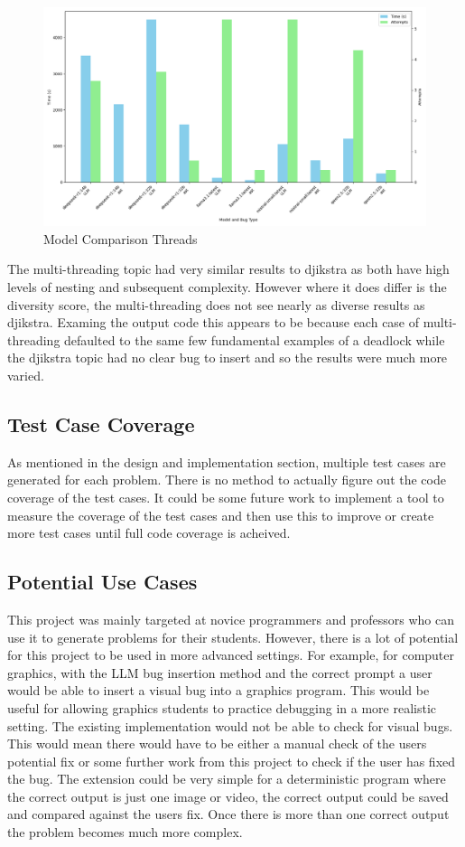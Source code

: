 \documentclass[12pt]{extarticle}
\begin{document}
\begin{figure}[H]
\centering
\includegraphics[width=0.7\linewidth]{Images/Model_Comparison_Threads.png}
\caption{Model Comparison Threads}
\label{fig:Model_Comparison_Threads}
\end{figure}



The multi-threading topic had very similar results to djikstra as both have high levels of nesting and subsequent complexity. However where it does differ is the diversity score, the multi-threading does not see nearly as diverse results as djikstra. Examing the output code this appears to be because each case of multi-threading defaulted to the same few fundamental examples of a deadlock while the djikstra topic had no clear bug to insert and so the results were much more varied.

\subsection{Test Case Coverage}

As mentioned in the design and implementation section, multiple test cases are generated for each problem. There is no method to actually figure out the code coverage of the test cases. It could be some future work to implement a tool to measure the coverage of the test cases and then use this to improve or create more test cases until full code coverage is acheived. 

\subsection{Potential Use Cases}

This project was mainly targeted at novice programmers and professors who can use it to generate problems for their students. However, there is a lot of potential for this project to be used in more advanced settings. For example, for computer graphics, with the LLM bug insertion method and the correct prompt a user would be able to insert a visual bug into a graphics program. This would be useful for allowing graphics students to practice debugging in a more realistic setting. The existing implementation would not be able to check for visual bugs. This would mean there would have to be either a manual check of the users potential fix or some further work from this project to check if the user has fixed the bug. The extension could be very simple for a deterministic program where the correct output is just one image or video, the correct output could be saved and compared against the users fix. Once there is more than one correct output the problem becomes much more complex.
\end{document}
